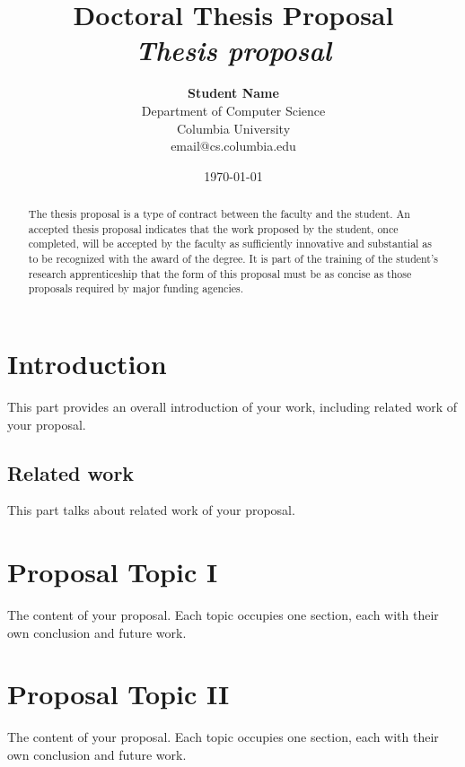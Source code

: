 \documentclass[12pt]{article}
\title{{\bf Doctoral Thesis Proposal} \\
\it Thesis proposal}
\author{ {\bf Student Name}  \\
Department of Computer Science \\
Columbia University\\
{\small email@cs.columbia.edu}
}
\date{\today}
\begin{document}
\pagestyle{plain}
\maketitle

\pagebreak
\begin{abstract}

The thesis proposal is a type of contract between the faculty and the student. 
An accepted thesis proposal indicates that the work proposed by the student, 
once completed, will be accepted by the faculty as sufficiently innovative and 
substantial as to be recognized with the award of the degree. It is part of 
the training of the student's research apprenticeship that the form of this 
proposal must be as concise as those proposals required by major funding 
agencies.

\end{abstract}

\pagebreak
\tableofcontents
\pagebreak

\cleardoublepage
{}

\section{Introduction}
\label{ch:intro}

This part provides an overall introduction of your work, including
related work of your proposal.

\subsection{Related work}
\label{ch:related}

This part talks about related work of your proposal.

\section{Proposal Topic I}
\label{ch:proposal}

The content of your proposal. Each topic occupies one section, each
with their own conclusion and future work.

\section{Proposal Topic II}
\label{ch:proposal}

The content of your proposal. Each topic occupies one section, each
with their own conclusion and future work.
\end{document}
